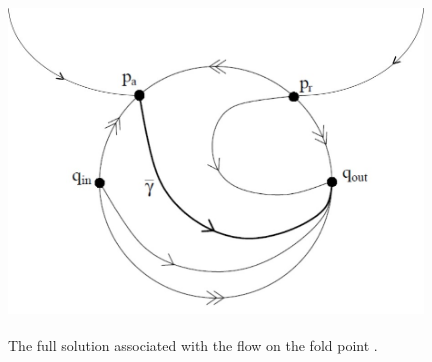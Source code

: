 %		

\begin{figure}[h!]\centering
	\includegraphics[height=9cm,width=11cm]{Images/blow-up}
	\caption{The full solution associated with the flow on the fold point \citep{krupa2001}.}
	\label{fig: full solution fold}
\end{figure}

























